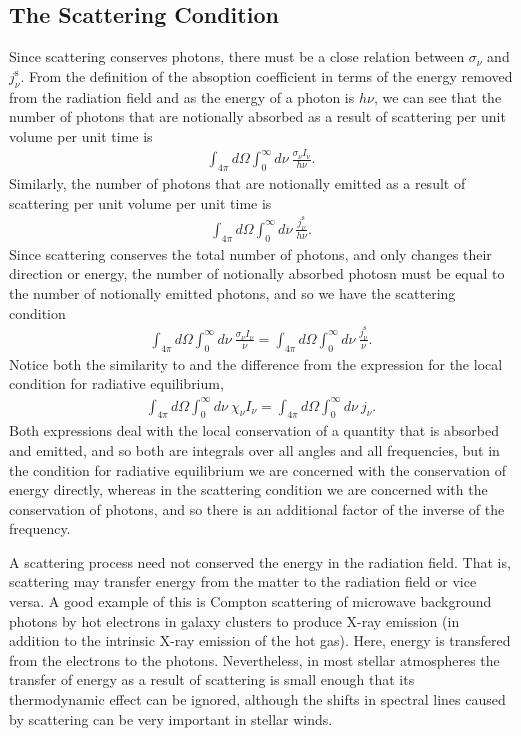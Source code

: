 \subsection{The Scattering Condition}

Since scattering conserves photons, there must be a close
relation between $\sigma_\nu$ and $j_\nu^\mathrm{s}$. From
the definition of the absoption coefficient in terms of the
energy removed from the radiation field and as the energy of
a photon is $h\nu$, we can see that the number of photons
that are notionally absorbed as a result of scattering per
unit volume per unit time is
\begin{align}
\int_{4\pi}\!\!\!d\Omega
\int_0^\infty\!\!\!d\nu
\:
\frac{\sigma_\nu I_\nu}{h\nu}.
\end{align}
Similarly, the number of photons that are notionally emitted
as a result of scattering per unit volume per unit time is
\begin{align}
\int_{4\pi}\!\!\!d\Omega
\int_0^\infty\!\!\!d\nu
\:
\frac{j_\nu^\mathrm{s}}{h\nu}.
\end{align}
Since scattering conserves the total number of photons, and
only changes their direction or energy, the number of
notionally absorbed photosn must be equal to the number of
notionally emitted photons, and so we have the scattering
condition
\begin{align}
\int_{4\pi}\!\!\!d\Omega
\int_0^\infty\!\!\!d\nu
\:
\frac{\sigma_\nu I_\nu}{\nu}
=
\int_{4\pi}\!\!\!d\Omega
\int_0^\infty\!\!\!d\nu
\:
\frac{j_\nu^\mathrm{s}}{\nu}.
\end{align}
Notice both the similarity to and the difference from the
expression for the local condition for radiative
equilibrium,
\begin{align}
\int_{4\pi}\!\!\!d\Omega
\int_0^\infty\!\!\!d\nu
\:
\chi_\nu I_\nu
=
\int_{4\pi}\!\!\!d\Omega
\int_0^\infty\!\!\!d\nu
\:
j_\nu.
\end{align}
Both expressions deal with the local conservation of a
quantity that is absorbed and emitted, and so both are
integrals over all angles and all frequencies, but in the
condition for radiative equilibrium we are concerned with
the conservation of energy directly, whereas in the
scattering condition we are concerned with the conservation
of photons, and so there is an additional factor of the
inverse of the frequency.

A scattering process need not conserved the energy in the
radiation field. That is, scattering may transfer energy
from the matter to the radiation field or vice versa. A good
example of this is Compton scattering of microwave
background photons by hot electrons in galaxy clusters to
produce X-ray emission (in addition to the intrinsic X-ray
emission of the hot gas). Here, energy is transfered from
the electrons to the photons. Nevertheless, in most stellar
atmospheres the transfer of energy as a result of scattering
is small enough that its thermodynamic effect can be
ignored, although the shifts in spectral lines caused by
scattering can be very important in stellar winds.


